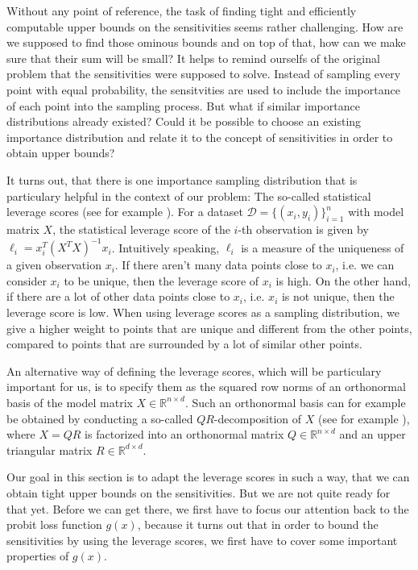 Without any point of reference, the task of finding tight
and efficiently computable upper bounds
on the sensitivities seems rather challenging.
How are we supposed to find those ominous bounds and on top of that,
how can we make sure that their sum will be small?
It helps to remind ourselfs of the original problem that the sensitivities
were supposed to solve. Instead of sampling every point with equal
probability, the sensitvities are used to include the importance
of each point into the sampling process.
But what if similar importance distributions already existed?
Could it be possible to choose an existing importance distribution
and relate it to the concept of sensitivities in order to
obtain upper bounds?

It turns out, that there is one importance sampling
distribution that is particulary helpful in the context of our problem:
The so-called statistical leverage scores (see for example
\cite{leverage-scores-drineas}).
For a dataset $\mathcal{D} = \{(x_i, y_i)\}_{i=1}^n$ with model
matrix $X$, the statistical leverage score of the $i$-th observation is
given by $\ell_i = x_i^T(X^TX)^{-1}x_i$.
Intuitively speaking, $\ell_i$ is a measure of the uniqueness of a given
observation $x_i$. If there aren't many
data points close to $x_i$, i.e. we can consider $x_i$ to be
unique, then the leverage score of $x_i$
is high. On the other hand, if there are a lot of other data points
close to $x_i$, i.e. $x_i$ is not unique, then the leverage score
is low. When using leverage scores as a sampling distribution, we
give a higher weight to points that are unique and different from
the other points, compared to points that are surrounded by a lot
of similar other points.

An alternative way of defining the leverage scores, which will
be particulary important for us, is to specify them as
the squared row norms of an orthonormal basis of the model matrix
$X \in \mathbb{R}^{n \times d}$.
Such an orthonormal basis can for example be obtained
by conducting a so-called $QR$-decomposition of $X$
(see for example \cite{matrix-computations}), where
$X = QR$ is factorized into an orthonormal matrix
$Q \in \mathbb{R}^{n \times d}$ and an upper triangular
matrix $R \in \mathbb{R}^{d \times d}$.

Our goal in this section is to adapt the leverage scores in
such a way, that we can obtain tight upper bounds on the sensitivities.
But we are not quite ready for that yet.
Before we can get there, we first have to focus our attention back
to the probit loss function $g(x)$, because it turns out that in order
to bound the sensitivities by using the leverage scores, we first
have to cover some important properties of $g(x)$.

